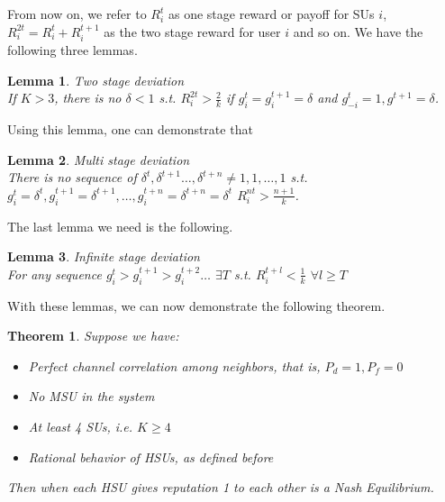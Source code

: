 \documentclass[letterpaper, 10 pt, conference]{ieeeconf}  %
\newtheorem{theorem}{Theorem}
\newtheorem{lemma}{Lemma}
\begin{document}
From now on, we refer to $R^t_i$ as one stage reward or payoff for SUs $i$, $R^{2t}_i=R^t_i+R^{t+1}_i$ as the two stage reward for user $i$ and so on. 
We have the following three lemmas.
\begin{lemma}{Two stage deviation}\\
\label{twostage}
If $K>3$, there is no $\delta<1$ s.t. $R^{2t}_i>\frac{2}{k}$ if $g^t_i=g^{t+1}_i=\delta$ and $g^t_{-i}=1,g^{t+1}=\delta$.
\end{lemma}
Using this lemma, one can demonstrate that 
\begin{lemma}{Multi stage deviation}\\
\label{multistage}
There is no sequence of $\delta^t,\delta^{t+1}\dots,\delta^{t+n}\neq1,1,\dots,1$ s.t.
$g^t_i=\delta^{t},g^{t+1}_i=\delta^{t+1},\dots,g^{t+n}_i=\delta^{t+n}=\delta^t$ $R^{nt}_i>\frac{n+1}{k}$.
\end{lemma}
The last lemma we need is the following.
\begin{lemma}{Infinite stage deviation}\\
\label{infinitestage}
For any sequence $g^{t}_i>g^{t+1}_i>g^{t+2}_i\dots$ $\exists T$ s.t. $R^{t+l}_i<\frac{1}{k}$ $\forall l\geq T$ 
\end{lemma}
With these lemmas, we can now demonstrate the following theorem.
\begin{theorem}
\label{theo1}
Suppose we have:
\begin{itemize}
\item{Perfect channel correlation among neighbors, that is, $P_d=1,P_f=0$}
\item{No MSU in the system}
\item{At least 4 SUs, i.e. $K\geq 4$}
\item{Rational behavior of HSUs, as defined before}
\end{itemize}
Then when each HSU gives reputation 1 to each other is a Nash Equilibrium. 
\end{theorem}
\end{document}
